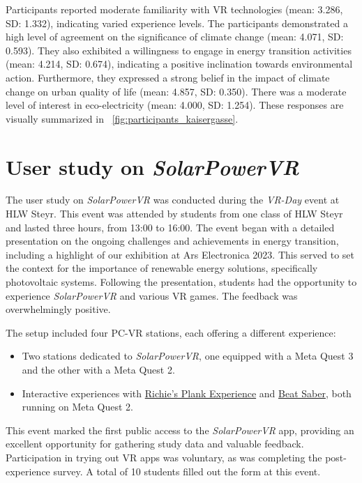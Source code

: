 \documentclass[draft, final]{vutinfth} %
\begin{document}
Participants reported moderate familiarity with VR technologies (mean: 3.286, SD: 1.332), indicating varied experience levels. The participants demonstrated a high level of agreement on the significance of climate change (mean: 4.071, SD: 0.593). They also exhibited a willingness to engage in energy transition activities (mean: 4.214, SD: 0.674), indicating a positive inclination towards environmental action. Furthermore, they expressed a strong belief in the impact of climate change on urban quality of life (mean: 4.857, SD: 0.350). There was a moderate level of interest in eco-electricity (mean: 4.000, SD: 1.254). These responses are visually summarized in \figurename~\ref{fig:participants_kaisergasse}.

\section{User study on \textit{SolarPowerVR}}

The user study on \textit{SolarPowerVR} was conducted during the \textit{VR-Day} event at HLW Steyr. This event was attended by students from one class of HLW Steyr and lasted three hours, from 13:00 to 16:00. The event began with a detailed presentation on the ongoing challenges and achievements in energy transition, including a highlight of our exhibition at Ars Electronica 2023. This served to set the context for the importance of renewable energy solutions, specifically photovoltaic systems. Following the presentation, students had the opportunity to experience \textit{SolarPowerVR} and various VR games. The feedback was overwhelmingly positive.

The setup included four PC-VR stations, each offering a different experience:
\begin{itemize}
    \item Two stations dedicated to \textit{SolarPowerVR}, one equipped with a Meta Quest 3 and the other with a Meta Quest 2.
    \item Interactive experiences with \hyperlink{https://store.steampowered.com/app/517160/Richies_Plank_Experience/}{Richie's Plank Experience} and \hyperlink{https://store.steampowered.com/app/620980/Beat_Saber/}{Beat Saber}, both running on Meta Quest 2.
\end{itemize}

This event marked the first public access to the \textit{SolarPowerVR} app, providing an excellent opportunity for gathering study data and valuable feedback. Participation in trying out VR apps was voluntary, as was completing the post-experience survey. A total of 10 students filled out the form at this event.
\end{document}
